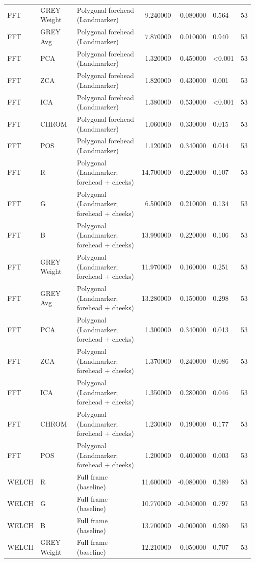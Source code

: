 \begin{table}[htbp]
\begin{tabular}{l l l r r l r}
FFT & GREY Weight & Polygonal forehead (Landmarker) & 9.240000 & -0.080000 & 0.564 & 53 \\
FFT & GREY Avg & Polygonal forehead (Landmarker) & 7.870000 & 0.010000 & 0.940 & 53 \\
FFT & PCA & Polygonal forehead (Landmarker) & 1.320000 & 0.450000 & <0.001 & 53 \\
FFT & ZCA & Polygonal forehead (Landmarker) & 1.820000 & 0.430000 & 0.001 & 53 \\
FFT & ICA & Polygonal forehead (Landmarker) & 1.380000 & 0.530000 & <0.001 & 53 \\
FFT & CHROM & Polygonal forehead (Landmarker) & 1.060000 & 0.330000 & 0.015 & 53 \\
FFT & POS & Polygonal forehead (Landmarker) & 1.120000 & 0.340000 & 0.014 & 53 \\
FFT & R & Polygonal (Landmarker; forehead + cheeks) & 14.700000 & 0.220000 & 0.107 & 53 \\
FFT & G & Polygonal (Landmarker; forehead + cheeks) & 6.500000 & 0.210000 & 0.134 & 53 \\
FFT & B & Polygonal (Landmarker; forehead + cheeks) & 13.990000 & 0.220000 & 0.106 & 53 \\
FFT & GREY Weight & Polygonal (Landmarker; forehead + cheeks) & 11.970000 & 0.160000 & 0.251 & 53 \\
FFT & GREY Avg & Polygonal (Landmarker; forehead + cheeks) & 13.280000 & 0.150000 & 0.298 & 53 \\
FFT & PCA & Polygonal (Landmarker; forehead + cheeks) & 1.300000 & 0.340000 & 0.013 & 53 \\
FFT & ZCA & Polygonal (Landmarker; forehead + cheeks) & 1.370000 & 0.240000 & 0.086 & 53 \\
FFT & ICA & Polygonal (Landmarker; forehead + cheeks) & 1.350000 & 0.280000 & 0.046 & 53 \\
FFT & CHROM & Polygonal (Landmarker; forehead + cheeks) & 1.230000 & 0.190000 & 0.177 & 53 \\
FFT & POS & Polygonal (Landmarker; forehead + cheeks) & 1.200000 & 0.400000 & 0.003 & 53 \\
WELCH & R & Full frame (baseline) & 11.600000 & -0.080000 & 0.589 & 53 \\
WELCH & G & Full frame (baseline) & 10.770000 & -0.040000 & 0.797 & 53 \\
WELCH & B & Full frame (baseline) & 13.700000 & -0.000000 & 0.980 & 53 \\
WELCH & GREY Weight & Full frame (baseline) & 12.210000 & 0.050000 & 0.707 & 53 \\

\end{tabular}
\end{table}
